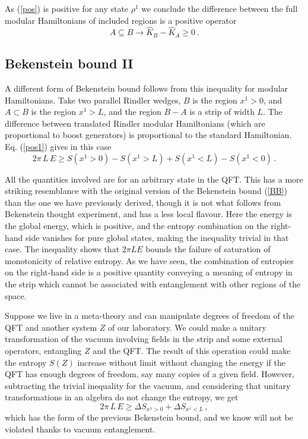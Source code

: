 \documentclass[12pt]{article}
\numberwithin{equation}{section}
\newcommand{\be}{\begin{equation}}
\newcommand{\ee}{\end{equation}}
\begin{document}
As (\ref{pos}) is positive for any state $\rho^1$ we conclude the difference between the full modular Hamiltonians of included regions is a positive operator
\be
A\subseteq B\rightarrow \hat{K}_B-\hat{K}_A\ge 0\,.\label{mono}
\ee
\subsection{Bekenstein bound II }

A different form of Bekenstein bound follows from this inequality for modular Hamiltonians. Take two parallel Rindler wedges, $B$ is the region $x^1>0$, and $A\subset B$ is the region $x^1>L$, and the region $B-A$ is a strip of width $L$. The difference between translated Rindler modular Hamiltonians (which are proportional to boost generators) is proportional to the standard Hamiltonian. Eq. (\ref{pos1}) gives in this case
\be
2 \pi \,L \,E\ge S(x^1>0)-S(x^1>L)+S(x^1<L)-S(x^1 <0)\,.    
\ee

All the quantities involved are for an arbitrary state in the QFT. This has a more striking resemblance with the original version of the Bekenstein bound (\ref{BB}) than the one we have previously derived, though it is not what follows from Bekenstein thought experiment, and has a less local flavour. Here the energy is the global energy, which is positive, and the entropy combination on the right-hand side vanishes for pure global states, making the inequality trivial in that case. The inequality shows that $2\pi L E $ bounds the failure of saturation of monotonicity of relative entropy. As we have seen, the combination of entropies on the right-hand side is a positive quantity conveying a meaning of entropy in the strip which cannot be associated with entanglement with other regions of the space. 

Suppose we live in a meta-theory and can manipulate degrees of freedom of the QFT and another system $Z$ of our laboratory. We could make a unitary transformation of the vacuum involving fields in the strip and some external operators, entangling $Z$ and the QFT. The result of this operation could make the entropy $S(Z)$ increase without limit without changing the energy if the QFT has enough degrees of freedom, say many copies of a given field. However, subtracting the trivial inequality for the vacuum, and considering that unitary transformations in an algebra do not change the entropy, we get 
\be
2\pi\,L\,  E\ge \Delta S_{x^1>0}+\Delta S_{x^1<L}\,,    
\ee
which has the form of the previous Bekenstein bound, and we know will not be violated thanks to vacuum entanglement.  
\end{document}
